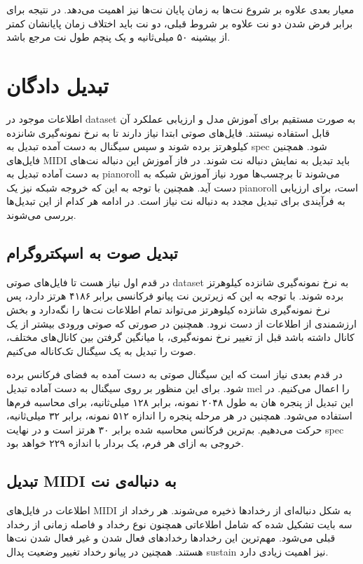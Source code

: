 معیار بعدی علاوه بر شروع نت‌ها به زمان پایان نت‌ها نیز اهمیت می‌دهد. در نتیجه
برای برابر فرض شدن دو نت علاوه بر شروط قبلی، دو نت باید اختلاف زمان پایانشان
کمتر از بیشینه ۵۰ میلی‌ثانیه و یک پنچم طول نت مرجع باشد.

\section{تبدیل دادگان}
اطلاعات موجود در \gls{dataset} به صورت مستقیم برای آموزش مدل و ارزیابی عملکرد آن
قابل استفاده نیستند. فایل‌های صوتی ابتدا نیاز دارند تا به نرخ نمونه‌گیری شانزده
کیلوهرتز برده شوند و سپس سیگنال به دست آمده تبدیل به \gls{spec} شود. همچنین
فایل‌های \gls{MIDI} باید تبدیل به نمایش دنباله نت شوند. در فاز آموزش این
دنباله نت‌های به دست آماده تبدیل به \gls{pianoroll} می‌شوند تا برچسب‌ها مورد
نیاز آموزش شبکه به دست آید. همچنین با توجه به این که خروجه شبکه نیز یک
\gls{pianoroll} است، برای ارزیابی به فرآیندی برای تبدیل مجدد به دنباله نت نیاز
است. در ادامه هر کدام از این تبدیل‌ها بررسی می‌شوند.

\subsection{تبدیل صوت به اسپکتروگرام}
در قدم اول نیاز هست تا فایل‌های صوتی \gls{dataset} به نرخ نمونه‌گیری شانزده
کیلوهرتز برده شوند. با توجه به این که زیرترین نت پیانو فرکانسی برابر ۴۱۸۶ هرتز
دارد، پس نرخ نمونه‌گیری شانزده کیلوهرتز می‌تواند تمام اطلاعات نت‌ها را نگه‌دارد
و بخش ارزشمندی از اطلاعات از دست نرود. همچنین در صورتی که صوتی ورودی بیشتر از یک
کانال داشته باشد قبل از تغییر نرخ نمونه‌گیری، با میانگین گرفتن بین کانال‌های
مختلف، صوت را تبدیل به یک سیگنال تک‌کاناله می‌کنیم.

در قدم بعدی نیاز است که این سیگنال صوتی به دست آمده به فضای فرکانس برده شود.
برای این منظور بر روی سیگنال به دست آماده تبدیل mel را اعمال می‌کنیم. در این
تبدیل از پنجره هان به طول ۲۰۴۸ نمونه، برابر ۱۲۸ میلی‌ثانیه، برای محاسبه فرم‌ها
استفاده می‌شود. همچنین در هر مرحله پنجره را اندازه ۵۱۲ نمونه، برابر ۳۲
میلی‌ثانیه، حرکت می‌دهیم. بم‌ترین فرکانس محاسبه شده برابر ۳۰ هرتز است و در نهایت
\gls{spec} خروجی به ازای هر فرم، یک بردار با اندازه ۲۲۹ خواهد بود.

\subsection{تبدیل MIDI به دنباله‌ی نت}
اطلاعات در فایل‌های \gls{MIDI} به شکل دنباله‌ای از رخدادها ذخیره می‌شوند. هر
رخداد از سه بایت تشکیل شده که شامل اطلاعاتی همچنون نوع رخداد و فاصله زمانی از
رخداد قبلی می‌شود. مهم‌ترین این رخدادها رخدادهای فعال شدن و غیر فعال شدن نت‌ها
هستند. همچنین در پیانو رخداد تغییر وضعیت پدال \gls{sustain} نیز اهمیت زیادی
دارد.

